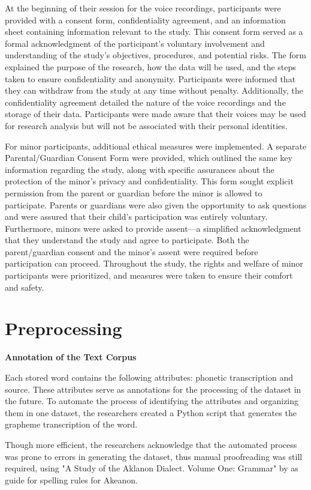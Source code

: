 At the beginning of their session for the voice recordings, participants were provided with a consent form, confidentiality agreement, and an information sheet containing information relevant to the study. This consent form served as a formal acknowledgment of the participant's voluntary involvement and understanding of the study's objectives, procedures, and potential risks. The form explained the purpose of the research, how the data will be used, and the steps taken to ensure confidentiality and anonymity. Participants were informed that they can withdraw from the study at any time without penalty. Additionally, the confidentiality agreement detailed the nature of the voice recordings and the storage of their data. Participants were made aware that their voices may be used for research analysis but will not be associated with their personal identities.

For minor participants, additional ethical measures were implemented. A separate Parental/Guardian Consent Form were provided, which outlined the same key information regarding the study, along with specific assurances about the protection of the minor’s privacy and confidentiality. This form sought explicit permission from the parent or guardian before the minor is allowed to participate. Parents or guardians were also given the opportunity to ask questions and were assured that their child’s participation was entirely voluntary. Furthermore, minors were asked to provide assent—a simplified acknowledgment that they understand the study and agree to participate. Both the parent/guardian consent and the minor's assent were required before participation can proceed. Throughout the study, the rights and welfare of minor participants were prioritized, and measures were taken to ensure their comfort and safety.

\section{Preprocessing}

\textbf{Annotation of the Text Corpus}

Each stored word contains the following attributes: phonetic transcription and source. These attributes serve as annotations for the processing of the dataset in the future. To automate the process of identifying the attributes and organizing them in one dataset, the researchers created a Python script that generates the grapheme transcription of the word.

Though more efficient, the researchers acknowledge that the automated process was prone to errors in generating the dataset, thus manual proofreading was still required, using "A Study of the Aklanon Dialect. Volume One: Grammar" by  as guide for spelling rules for Akeanon.

